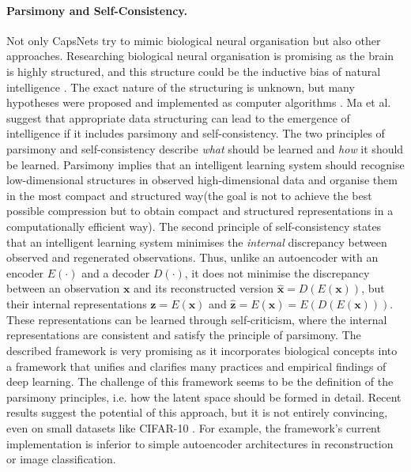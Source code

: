 \paragraph{Parsimony and Self-Consistency.} Not only CapsNets try to mimic biological neural organisation but also other approaches. Researching biological neural organisation is promising as the brain is highly structured, and this structure could be the inductive bias of natural intelligence . The exact nature of the structuring is unknown, but many hypotheses were proposed and implemented as computer algorithms . Ma et al.  suggest that appropriate data structuring can lead to the emergence of intelligence if it includes parsimony and self-consistency. The two principles of parsimony and self-consistency describe \emph{what} should be learned and \emph{how} it should be learned. Parsimony implies that an intelligent learning system should recognise low-dimensional structures in observed high-dimensional data and organise them in the most compact and structured way\sidenote(the goal is not to achieve the best possible compression but to obtain compact and structured representations in a computationally efficient way). The second principle of self-consistency states that an intelligent learning system minimises the \emph{internal} discrepancy between observed and regenerated observations. Thus, unlike an autoencoder with an encoder $E(\cdot)$ and a decoder $D(\cdot)$, it does not minimise the discrepancy between an observation $\boldsymbol{x}$ and its reconstructed version $\boldsymbol{\hat{x}} = D(E(\boldsymbol{x}))$, but their internal representations $\boldsymbol{z} = E(\boldsymbol{x})$ and $\boldsymbol{\hat{z}} = E(\boldsymbol{\hat{x}}) = E(D(E(\boldsymbol{x})))$. These representations can be learned through self-criticism, where the internal representations are consistent and satisfy the principle of parsimony. The described framework is very promising as it incorporates biological concepts into a framework that unifies and clarifies many practices and empirical findings of deep learning. The challenge of this framework seems to be the definition of the parsimony principles, i.e. how the latent space should be formed in detail. Recent results suggest the potential of this approach, but it is not entirely convincing, even on small datasets like CIFAR-10 \cite{cifar_10}. For example, the framework's current implementation is inferior to simple autoencoder architectures in reconstruction or image classification.

